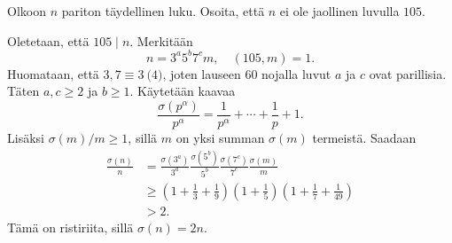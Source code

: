 \documentclass[11pt,a4paper]{amsart}
\begin{document}
\begin{exercise}
  Olkoon \(n\) pariton täydellinen luku. Osoita, että \(n\) ei ole
  jaollinen luvulla \(105\).
\end{exercise}

\begin{solution}
  Oletetaan, että \(105 \mid n\). Merkitään
  \[
    n = 3^a5^b7^cm, \quad (105, m) = 1.
  \]
  Huomataan, että \(3, 7 \equiv 3 \pod{4}\), joten lauseen 60 nojalla luvut
  \(a\) ja \(c\) ovat parillisia. Täten \(a,c \geq 2\) ja \(b \geq 1\).
  Käytetään kaavaa
  \[
    \frac{\sigma(p^\alpha)}{p^\alpha} = \frac{1}{p^\alpha} + \cdots
    + \frac{1}{p} + 1.
  \]
  Lisäksi \(\sigma(m)/m \geq 1\), sillä \(m\) on yksi summan
  \(\sigma(m)\) termeistä. Saadaan
  \[
    \begin{aligned}
      \frac{\sigma(n)}{n} &=
      \frac{\sigma(3^a)}{3^a}\frac{\sigma(5^b)}{5^b}\frac{\sigma(7^c)}{7^c}\frac{\sigma(m)}{m}
      \\ &\geq \left(1 + \frac{1}{3} + \frac{1}{9}\right)
      \left(1 + \frac{1}{5}\right)\left(1 + \frac{1}{7} + \frac{1}{49}\right) \\
      &> 2.
    \end{aligned}
  \]
  Tämä on ristiriita, sillä \(\sigma(n) = 2n\).
\end{solution}
\end{document}
